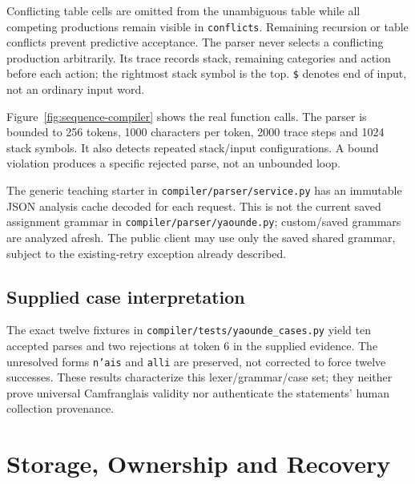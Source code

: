 \documentclass[11pt,a4paper]{article}
\begin{document}
Conflicting table cells are omitted from the unambiguous table while all
competing productions remain visible in \texttt{conflicts}. Remaining recursion
or table conflicts prevent predictive acceptance. The parser never selects a
conflicting production arbitrarily. Its trace records stack, remaining
categories and action before each action; the rightmost stack symbol is the top.
\texttt{\$} denotes end of input, not an ordinary input word.

Figure~\ref{fig:sequence-compiler} shows the real function calls. The parser is
bounded to 256 tokens, 1000 characters per token, 2000 trace steps and 1024 stack
symbols. It also detects repeated stack/input configurations. A bound violation
produces a specific rejected parse, not an unbounded loop.

The generic teaching starter in \nolinkurl{compiler/parser/service.py} has an
immutable JSON analysis cache decoded for each request. This is not the current
saved assignment grammar in \nolinkurl{compiler/parser/yaounde.py}; custom/saved
grammars are analyzed afresh. The public client may use only the saved shared
grammar, subject to the existing-retry exception already described.

\subsection{Supplied case interpretation}
The exact twelve fixtures in \nolinkurl{compiler/tests/yaounde_cases.py} yield
ten accepted parses and two rejections at token 6 in the supplied evidence.
The unresolved forms \texttt{n'ais} and \texttt{alli} are preserved, not corrected
to force twelve successes. These results characterize this lexer/grammar/case
set; they neither prove universal Camfranglais validity nor authenticate the
statements' human collection provenance.

\section{Storage, Ownership and Recovery}
\end{document}
